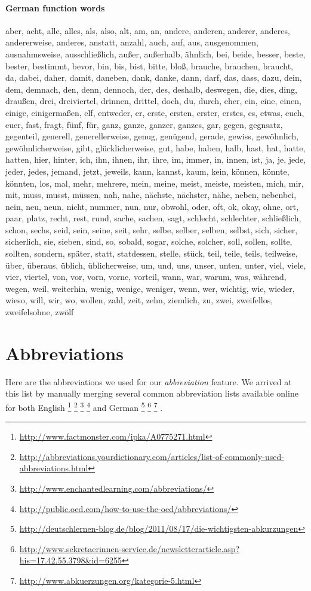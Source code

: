 \paragraph{German function words}
aber, acht, alle, alles, als, also, alt, am, an, andere, anderen, anderer, anderes, andererweise, anderes, anstatt, anzahl, auch, auf, aus, ausgenommen, ausnahmsweise, ausschließlich, außer, außerhalb, ähnlich, bei, beide, besser, beste, bester, bestimmt, bevor, bin, bis, bist, bitte, bloß, brauche, brauchen, braucht, da, dabei, daher, damit, daneben, dank, danke, dann, darf, das, dass, dazu, dein, dem, demnach, den, denn, dennoch, der, des, deshalb, deswegen, die, dies, ding, draußen, drei, dreiviertel, drinnen, drittel, doch, du, durch, eher, ein, eine, einen, einige, einigermaßen, elf, entweder, er, erste, ersten, erster, erstes, es, etwas, euch, euer, fast, fragt, fünf, für, ganz, ganze, ganzer, ganzes, gar, gegen, gegnsatz, gegenteil, generell, generellerweise, genug, genügend, gerade, gewiss, gewöhnlich, gewöhnlicherweise, gibt, glücklicherweise, gut, habe, haben, halb, hast, hat, hatte, hatten, hier, hinter, ich, ihn, ihnen, ihr, ihre, im, immer, in, innen, ist, ja, je, jede, jeder, jedes, jemand, jetzt, jeweils, kann, kannst, kaum, kein, können, könnte, könnten, los, mal, mehr, mehrere, mein, meine, meist, meiste, meisten, mich, mir, mit, muss, musst, müssen, nah, nahe, nächste, nächster, nähe, neben, nebenbei, nein, neu, neun, nicht, nummer, nun, nur, obwohl, oder, oft, ok, okay, ohne, ort, paar, platz, recht, rest, rund, sache, sachen, sagt, schlecht, schlechter, schließlich, schon, sechs, seid, sein, seine, seit, sehr, selbe, selber, selben, selbst, sich, sicher, sicherlich, sie, sieben, sind, so, sobald, sogar, solche, solcher, soll, sollen, sollte, sollten, sondern, später, statt, statdessen, stelle, stück, teil, teile, teils, teilweise, über, überaus, üblich, üblicherweise, um, und, uns, unser, unten, unter, viel, viele, vier, viertel, von, vor, vorn, vorne, vorteil, wann, war, warum, was, während, wegen, weil, weiterhin, wenig, wenige, weniger, wenn, wer, wichtig, wie, wieder, wieso, will, wir, wo, wollen, zahl, zeit, zehn, ziemlich, zu, zwei, zweifellos, zweifelsohne, zwölf


\section{Abbreviations}
\label{sec:app_abbreviations}
Here are the abbreviations we used for our \textit{abbreviation} feature. We arrived at this list by manually merging several common abbreviation lists available online for both English
\footnote{\url{http://www.factmonster.com/ipka/A0775271.html}}
\footnote{\url{http://abbreviations.yourdictionary.com/articles/list-of-commonly-used-abbreviations.html}}
\footnote{\url{http://www.enchantedlearning.com/abbreviations/}}
\footnote{\url{http://public.oed.com/how-to-use-the-oed/abbreviations/}}
and German
\footnote{\url{http://deutschlernen-blog.de/blog/2011/08/17/die-wichtigsten-abkurzungen}}
\footnote{\url{http://www.sekretaerinnen-service.de/newsletterarticle.asp?his=17.42.55.3798&id=6255}}
\footnote{\url{http://www.abkuerzungen.org/kategorie-5.html}}
.


